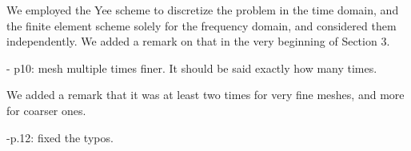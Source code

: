 \documentclass[a4paper,10pt]{article}
\begin{document}
We employed the Yee scheme to discretize the problem in the time domain, and the finite element scheme solely for the frequency domain, 
and considered them independently. We added a remark on that in the very beginning of Section 3. 

- p10: mesh multiple times finer. It should be said exactly how many times. 

We added a remark that it was at least two times for very fine meshes, and more for coarser ones.

-p.12: fixed the typos.


  
 
\end{document}
